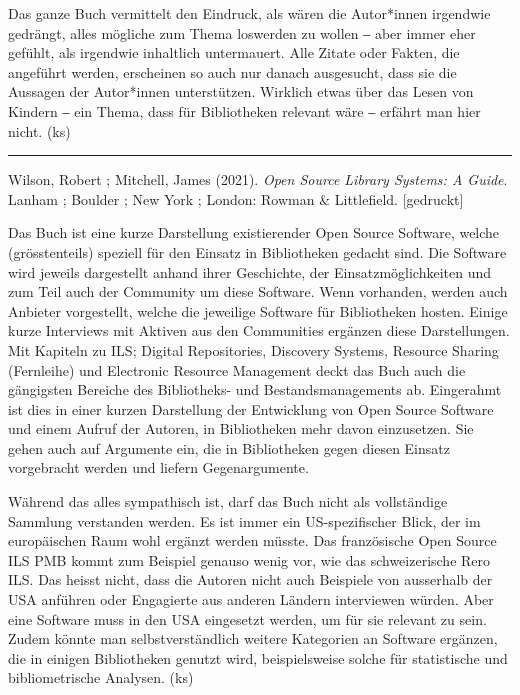 \documentclass[a4paper,
fontsize=11pt,
oneside,
numbers=noperiodatend,
parskip=half-,
bibliography=totoc,
final
]{scrartcl}
\begin{document}
Das ganze Buch vermittelt den Eindruck, als wären die Autor*innen
irgendwie gedrängt, alles mögliche zum Thema loswerden zu wollen ‒ aber
immer eher gefühlt, als irgendwie inhaltlich untermauert. Alle Zitate
oder Fakten, die angeführt werden, erscheinen so auch nur danach
ausgesucht, dass sie die Aussagen der Autor*innen unterstützen. Wirklich
etwas über das Lesen von Kindern ‒ ein Thema, dass für Bibliotheken
relevant wäre ‒ erfährt man hier nicht. (ks)

\begin{center}\rule{0.5\linewidth}{0.5pt}\end{center}

Wilson, Robert ; Mitchell, James (2021). \emph{Open Source Library
Systems: A Guide}. Lanham ; Boulder ; New York ; London: Rowman \&
Littlefield. {[}gedruckt{]}

Das Buch ist eine kurze Darstellung existierender Open Source Software,
welche (grösstenteils) speziell für den Einsatz in Bibliotheken gedacht
sind. Die Software wird jeweils dargestellt anhand ihrer Geschichte, der
Einsatzmöglichkeiten und zum Teil auch der Community um diese Software.
Wenn vorhanden, werden auch Anbieter vorgestellt, welche die jeweilige
Software für Bibliotheken hosten. Einige kurze Interviews mit Aktiven
aus den Communities ergänzen diese Darstellungen. Mit Kapiteln zu ILS;
Digital Repositories, Discovery Systems, Resource Sharing (Fernleihe)
und Electronic Resource Management deckt das Buch auch die gängigsten
Bereiche des Bibliotheks- und Bestandsmanagements ab. Eingerahmt ist
dies in einer kurzen Darstellung der Entwicklung von Open Source
Software und einem Aufruf der Autoren, in Bibliotheken mehr davon
einzusetzen. Sie gehen auch auf Argumente ein, die in Bibliotheken gegen
diesen Einsatz vorgebracht werden und liefern Gegenargumente.

Während das alles sympathisch ist, darf das Buch nicht als vollständige
Sammlung verstanden werden. Es ist immer ein US-spezifischer Blick, der
im europäischen Raum wohl ergänzt werden müsste. Das französische Open
Source ILS PMB kommt zum Beispiel genauso wenig vor, wie das
schweizerische Rero ILS. Das heisst nicht, dass die Autoren nicht auch
Beispiele von ausserhalb der USA anführen oder Engagierte aus anderen
Ländern interviewen würden. Aber eine Software muss in den USA
eingesetzt werden, um für sie relevant zu sein. Zudem könnte man
selbstverständlich weitere Kategorien an Software ergänzen, die in
einigen Bibliotheken genutzt wird, beispielsweise solche für
statistische und bibliometrische Analysen. (ks)
\end{document}
